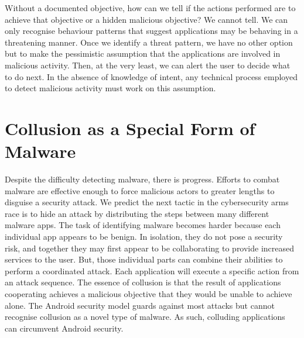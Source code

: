 Without a documented objective, how can we tell if the actions performed are to achieve that objective or a hidden malicious objective?  We cannot tell.  We can only recognise behaviour patterns that suggest applications may be behaving in a threatening manner.  Once we identify a threat pattern, we have no other option but to make the pessimistic assumption that the applications are involved in malicious activity.  Then, at the very least, we can alert the user to decide what to do next.  In the absence of knowledge of intent, any technical process employed to detect malicious activity must work on this assumption.

\section{Collusion as a Special Form of Malware}

Despite the difficulty detecting malware, there is progress.  Efforts to combat malware are effective enough to force malicious actors to greater lengths to disguise a security attack.  We predict the next tactic in the cybersecurity arms race is to hide an attack by distributing the steps between many different malware apps.  The task of identifying malware becomes harder because each individual app appears to be benign.  In isolation, they do not pose a security risk, and together they may first appear to be collaborating to provide increased services to the user.  But, those individual parts can combine their abilities to perform a coordinated attack.  Each application will execute a specific action from an attack sequence.  The essence of collusion is that the result of applications cooperating achieves a malicious objective that they would be unable to achieve alone.  The Android security model guards against most attacks but cannot recognise collusion as a novel type of malware.  As such, colluding applications can circumvent Android security.


